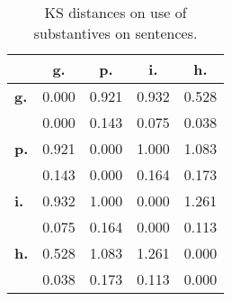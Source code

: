 \begin{table}[h!]
\begin{center}
\begin{tabular}{| l || c | c | c | c |}\hline
 & {\bf g.} & {\bf p.} & {\bf i.} & {\bf h.} \\\hline\hline
{\bf g.} & 0.000 & 0.921 & 0.932 & 0.528 \\
{\bf } & 0.000 & 0.143 & 0.075 & 0.038 \\\hline
{\bf p.} & 0.921 & 0.000 & 1.000 & 1.083 \\
{\bf } & 0.143 & 0.000 & 0.164 & 0.173 \\\hline
{\bf i.} & 0.932 & 1.000 & 0.000 & 1.261 \\
{\bf } & 0.075 & 0.164 & 0.000 & 0.113 \\\hline
{\bf h.} & 0.528 & 1.083 & 1.261 & 0.000 \\
{\bf } & 0.038 & 0.173 & 0.113 & 0.000 \\\hline
\end{tabular}
\caption{KS distances on use of substantives on sentences.}
\end{center}
\end{table}